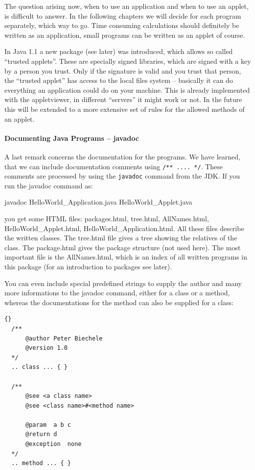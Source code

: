 The question arising now, when to use an application and when to use
an applet, is difficult to answer. In the following chapters we will 
decide for each program
separately, which way to go. Time consuming calculations should
definitely be written as an application, small programs can be
written as an applet of course.

In Java 1.1 a new package (see later) was introduced, which allows
so called ``trusted applets''. These are specially signed libraries,
which are signed with a key by a person you trust. Only if the
signature is valid and you trust that person, the ``trusted applet''
has access to the local files system -- basically it can do everything
an application could do on your machine. This is already implemented with
the appletviewer, in different ``servers'' it might work or not. In the
future this will be extended to a more extensive set of rules for the
allowed methods of an applet.

\paragraph{Documenting Java Programs -- javadoc}
A last remark concerns the documentation for the programs. We have
learned, that we can include documentation comments using 
\verb|/** .... */|. These comments are processed by using the
\verb|javadoc| command from the JDK. If you run the javadoc command as: 
\begin{sverbatim}
  javadoc HelloWorld_Application.java HelloWorld_Applet.java  
\end{sverbatim}
you get some HTML files: packages.html, tree.html, AllNames.html,
HelloWorld\_Applet.html, HelloWorld\_Application.html. All these
files describe the written classes. The tree.html file gives a tree
showing the relatives of the class. The package.html gives the
package structure (not used here). The most important file is the
AllNames.html, which is an index of all written programs in this package
(for an introduction to packages see later).

You can even include special predefined strings to supply the
author and many more informations to the javadoc command, either
for a class or a method, whereas the documentations for the method
can also be supplied for a class:
\begin{lstlisting}{}
  /**
      @author Peter Biechele
      @version 1.0
  */
  .. class ... { }

  /** 
      @see <a class name>
      @see <class name>#<method name>

      @param  a b c
      @return d
      @exception  none
  */
  .. method ... { }
\end{lstlisting}

